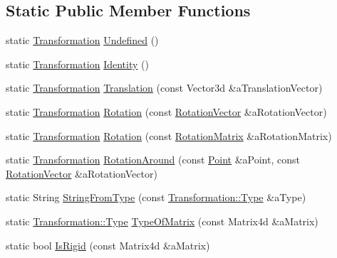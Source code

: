 \subsection*{Static Public Member Functions}
\begin{DoxyCompactItemize}
\item 
static \hyperlink{classlibrary_1_1math_1_1geom_1_1d3_1_1_transformation}{Transformation} \hyperlink{classlibrary_1_1math_1_1geom_1_1d3_1_1_transformation_acb7375bde02ed5832d5937908bee7043}{Undefined} ()
\item 
static \hyperlink{classlibrary_1_1math_1_1geom_1_1d3_1_1_transformation}{Transformation} \hyperlink{classlibrary_1_1math_1_1geom_1_1d3_1_1_transformation_a8d5af972dbba51f5746f2248f5164b69}{Identity} ()
\item 
static \hyperlink{classlibrary_1_1math_1_1geom_1_1d3_1_1_transformation}{Transformation} \hyperlink{classlibrary_1_1math_1_1geom_1_1d3_1_1_transformation_a5f781ba4e25ce79a02afccbe94a1ab0a}{Translation} (const Vector3d \&a\+Translation\+Vector)
\item 
static \hyperlink{classlibrary_1_1math_1_1geom_1_1d3_1_1_transformation}{Transformation} \hyperlink{classlibrary_1_1math_1_1geom_1_1d3_1_1_transformation_a79978a6efb749a2e058aa0b2cea092b2}{Rotation} (const \hyperlink{classlibrary_1_1math_1_1geom_1_1d3_1_1trf_1_1rot_1_1_rotation_vector}{Rotation\+Vector} \&a\+Rotation\+Vector)
\item 
static \hyperlink{classlibrary_1_1math_1_1geom_1_1d3_1_1_transformation}{Transformation} \hyperlink{classlibrary_1_1math_1_1geom_1_1d3_1_1_transformation_a017bb92fe8ee25689759c4a076a2807e}{Rotation} (const \hyperlink{classlibrary_1_1math_1_1geom_1_1d3_1_1trf_1_1rot_1_1_rotation_matrix}{Rotation\+Matrix} \&a\+Rotation\+Matrix)
\item 
static \hyperlink{classlibrary_1_1math_1_1geom_1_1d3_1_1_transformation}{Transformation} \hyperlink{classlibrary_1_1math_1_1geom_1_1d3_1_1_transformation_a11d93f665adb24cc4fdf2244c8509082}{Rotation\+Around} (const \hyperlink{classlibrary_1_1math_1_1geom_1_1d3_1_1objects_1_1_point}{Point} \&a\+Point, const \hyperlink{classlibrary_1_1math_1_1geom_1_1d3_1_1trf_1_1rot_1_1_rotation_vector}{Rotation\+Vector} \&a\+Rotation\+Vector)
\item 
static String \hyperlink{classlibrary_1_1math_1_1geom_1_1d3_1_1_transformation_a9511c7844b5b8af0c8c7ad97454a5a96}{String\+From\+Type} (const \hyperlink{classlibrary_1_1math_1_1geom_1_1d3_1_1_transformation_a25f1dc99d391174bf82a7132d08b2fc1}{Transformation\+::\+Type} \&a\+Type)
\item 
static \hyperlink{classlibrary_1_1math_1_1geom_1_1d3_1_1_transformation_a25f1dc99d391174bf82a7132d08b2fc1}{Transformation\+::\+Type} \hyperlink{classlibrary_1_1math_1_1geom_1_1d3_1_1_transformation_aa532f2c9f56ee5aff63417283a930584}{Type\+Of\+Matrix} (const Matrix4d \&a\+Matrix)
\item 
static bool \hyperlink{classlibrary_1_1math_1_1geom_1_1d3_1_1_transformation_aa37987be864c3bf60167721c5c41eabc}{Is\+Rigid} (const Matrix4d \&a\+Matrix)
\end{DoxyCompactItemize}
